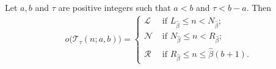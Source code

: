 \documentclass[oneside,reqno]{amsart}
\newcommand{\ts}{\mathcal{T}}
\newcommand{\lp}{\mathscr{L}}
\newcommand{\rp}{\mathscr{R}}
\newcommand{\np}{\mathscr{N}}
\newcommand{\hbeta}{\widehat\beta}
\begin{document}
\begin{lemma}\label{lem: outcome ts in alpha block}
    Let $a,b$ and $\tau$ are positive integers such that $a<b$ and $\tau<b-a$. %
    Then \begin{align}
        o\big(\ts_\tau(n;a,b)\big)=\begin{cases}
            \lp & \text{ if } L_{\hbeta} \le  n<N_{\hbeta} ;\\
            \np & \text{ if } N_{\hbeta}\le  n< R_{\hbeta};\\
            \rp & \text{ if } R_{\hbeta}\le  n\le {\hbeta}(b+1).
        \end{cases}
    \end{align}
\end{lemma}
\end{document}
